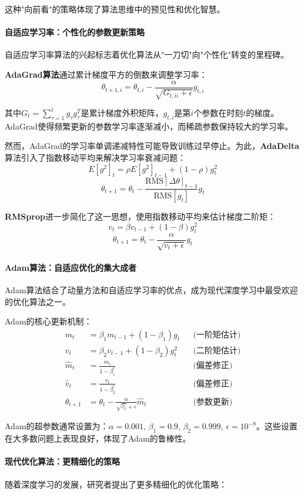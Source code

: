 这种"向前看"的策略体现了算法思维中的预见性和优化智慧。

\paragraph{自适应学习率：个性化的参数更新策略}
自适应学习率算法的兴起标志着优化算法从"一刀切"向"个性化"转变的里程碑。

\textbf{AdaGrad算法}通过累计梯度平方的倒数来调整学习率：
$$\theta_{t+1,i} = \theta_{t,i} - \frac{\alpha}{\sqrt{G_{t,ii} + \epsilon}} g_{t,i}$$

其中$G_t = \sum_{\tau=1}^{t} g_\tau g_\tau^T$是累计梯度外积矩阵，$g_{t,i}$是第$i$个参数在时刻$t$的梯度。AdaGrad使得频繁更新的参数学习率逐渐减小，而稀疏参数保持较大的学习率。

然而，AdaGrad的学习率单调递减特性可能导致训练过早停止。为此，\textbf{AdaDelta}算法引入了指数移动平均来解决学习率衰减问题：
$$E[g^2]_t = \rho E[g^2]_{t-1} + (1-\rho) g_t^2$$
$$\theta_{t+1} = \theta_t - \frac{\text{RMS}[\Delta \theta]_{t-1}}{\text{RMS}[g_t]} g_t$$

\textbf{RMSprop}进一步简化了这一思想，使用指数移动平均来估计梯度二阶矩：
$$v_t = \beta v_{t-1} + (1-\beta) g_t^2$$
$$\theta_{t+1} = \theta_t - \frac{\alpha}{\sqrt{v_t + \epsilon}} g_t$$

\paragraph{Adam算法：自适应优化的集大成者}
Adam算法结合了动量方法和自适应学习率的优点，成为现代深度学习中最受欢迎的优化算法之一。

Adam的核心更新机制：
\begin{align}
m_t &= \beta_1 m_{t-1} + (1-\beta_1) g_t && \text{(一阶矩估计)} \\
v_t &= \beta_2 v_{t-1} + (1-\beta_2) g_t^2 && \text{(二阶矩估计)} \\
\hat{m}_t &= \frac{m_t}{1-\beta_1^t} && \text{(偏差修正)} \\
\hat{v}_t &= \frac{v_t}{1-\beta_2^t} && \text{(偏差修正)} \\
\theta_{t+1} &= \theta_t - \frac{\alpha}{\sqrt{\hat{v}_t} + \epsilon} \hat{m}_t && \text{(参数更新)}
\end{align}

Adam的超参数通常设置为：$\alpha=0.001$, $\beta_1=0.9$, $\beta_2=0.999$, $\epsilon=10^{-8}$。这些设置在大多数问题上表现良好，体现了Adam的鲁棒性。

\paragraph{现代优化算法：更精细化的策略}
随着深度学习的发展，研究者提出了更多精细化的优化策略：


